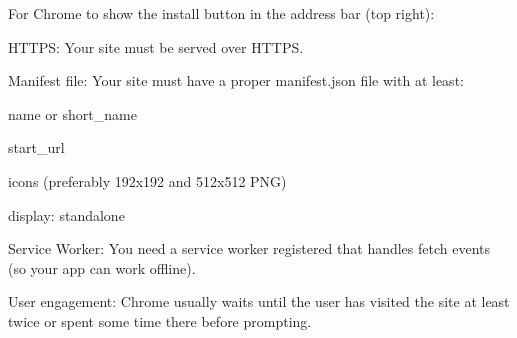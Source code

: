 For Chrome to show the install button in the address bar (top right):

HTTPS: Your site must be served over HTTPS.

Manifest file: Your site must have a proper manifest.json file with at least:

name or short_name

start_url

icons (preferably 192x192 and 512x512 PNG)

display: standalone

Service Worker: You need a service worker registered that handles fetch events (so your app can work offline).

User engagement: Chrome usually waits until the user has visited the site at least twice or spent some time there before prompting.